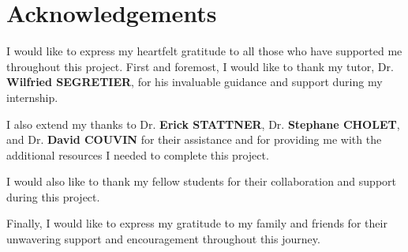 \chapter*{Acknowledgements}
\label{chap:acknowledgements}

I would like to express my heartfelt gratitude to all those who have supported me throughout this project. First and foremost,
I would like to thank my tutor, Dr. \textbf{Wilfried SEGRETIER}, for his invaluable guidance and support during my internship.

I also extend my thanks to Dr. \textbf{Erick STATTNER}, Dr. \textbf{Stephane CHOLET}, and Dr. \textbf{David COUVIN} for their
assistance and for providing me with the additional resources I needed to complete this project.

I would also like to thank my fellow students for their collaboration and support during this project.

Finally, I would like to express my gratitude to my family and friends for their unwavering support and encouragement throughout this journey.